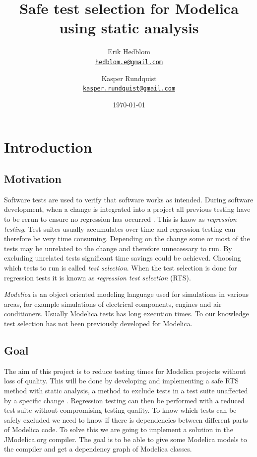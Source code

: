 \documentclass{cslthse-msc}
\author{
	Erik Hedblom \\
	{\normalsize \href{mailto:hedblom.e@gmail.com}{\texttt{hedblom.e@gmail.com}}}
	\and
	Kasper Rundquist \\
	{\normalsize \href{mailto:kasper.rundquist@gmail.com}{\texttt{kasper.rundquist@gmail.com}}}
}
\title{Safe test selection for Modelica using static analysis}
\date{\today}
\begin{document}
\makefrontmatter
\chapter[Introduction]{Introduction}


\section{Motivation}
Software tests are used to verify that software works as intended.
During software development, when a change is integrated into a project all previous testing have to be rerun to ensure no regression has occurred \cite{DBLP:conf/sigsoft/LegunsenHSLZM16, haider2016safe}. This is know as \emph{regression testing}. Test suites usually accumulates over time and regression testing can therefore be very time consuming. Depending on the change some or most of the tests may be unrelated to the change and therefore unnecessary to run. By excluding unrelated tests significant time savings could be achieved. Choosing which tests to run is called \emph{test selection}. When the test selection is done for regression tests it is known as \emph{regression test selection} (RTS).

\emph{Modelica} is an object oriented modeling language used for simulations in various areas, for example simulations of electrical components, engines and air conditioners. Usually Modelica tests has long execution times. To our knowledge test selection has not been previously developed for Modelica.



\section{Goal}
The aim of this project is to reduce testing times for Modelica projects without loss of quality. This will be done by developing and implementing a safe RTS method with static analysis, a method to exclude tests in a test suite unaffected by a specific change \cite{DBLP:conf/pppj/OqvistHM16}. Regression testing can then be performed with a reduced test suite without compromising testing quality. To know which tests can be safely excluded we need to know if there is dependencies between different parts of Modelica code. To solve this we are going to implement a solution in the JModelica.org compiler. The goal is to be able to give some Modelica models to the compiler and get a dependency graph of Modelica classes.
\end{document}
